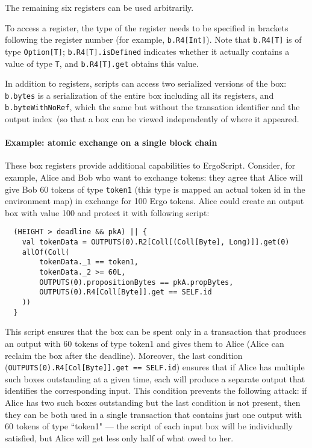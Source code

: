 \documentclass[11pt]{article}
\newcommand{\langname}{ErgoScript\xspace}
\begin{document}
The remaining six registers can be used arbitrarily. 

To access a register, the type of the register needs to be specified in brackets following the register number (for example, \texttt{b.R4[Int]}). Note that \texttt{b.R4[T]} is of type \texttt{Option[T]}; \texttt{b.R4[T].isDefined} indicates whether it actually contains a value of type \texttt{T}, and \texttt{b.R4[T].get} obtains this value.

In addition to registers, scripts can access two serialized versions of the box: \texttt{b.bytes} is a serialization of the entire box including all its registers, and \texttt{b.byteWithNoRef}, which the same but without the transation identifier and the output index~(so that a box can be viewed independently of where it appeared.

\paragraph{Example: atomic exchange on a single block chain}
These box registers provide additional capabilities to \langname. Consider, for example, Alice and Bob who want to exchange tokens: they agree that  Alice will give Bob 60 tokens of type \texttt{token1} (this type is mapped an actual token id in the environment map) in exchange for 100 Ergo tokens. Alice could create an output box with value 100 and protect it with following script:

\begin{verbatim}
  (HEIGHT > deadline && pkA) || {
    val tokenData = OUTPUTS(0).R2[Coll[(Coll[Byte], Long)]].get(0)
    allOf(Coll(
        tokenData._1 == token1,
        tokenData._2 >= 60L,
        OUTPUTS(0).propositionBytes == pkA.propBytes,
        OUTPUTS(0).R4[Coll[Byte]].get == SELF.id
    ))
  }
\end{verbatim}


This script ensures that the box can be spent only in a transaction that produces an output with 60 tokens of type token1 and gives them to Alice (Alice can reclaim the box after the deadline). 
Moreover, the last condition (\texttt{OUTPUTS(0).R4[Col[Byte]].get == SELF.id}) ensures that if Alice has multiple such boxes outstanding at a given time, each will produce a separate output that identifies the corresponding input. This condition prevents the following attack: if Alice has two such boxes outstanding but the last condition is not present, then they can be both used in a single transaction that contains just one output with 60 tokens of type ``token1" --- the script of each input box will be individually satisfied, but Alice will get less only half of what owed to her.
\end{document}
